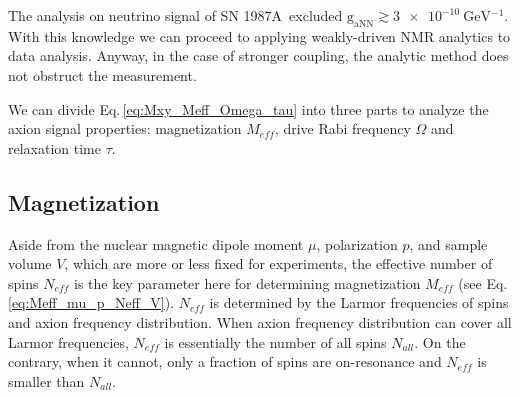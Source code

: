 The analysis on neutrino signal of SN 1987A\,\cite{Raffelt_PhysRevD.86.015001} excluded $\mathrm{g_{aNN}} \gtrsim \SI{3e-10}{\GeV^{-1}}$. 
With this knowledge we can proceed to applying weakly-driven NMR analytics to data analysis. Anyway, in the case of stronger coupling, the analytic method does not obstruct the measurement. 

We can divide Eq.\,\eqref{eq:Mxy_Meff_Omega_tau} into three parts to analyze the axion signal properties: magnetization $M_{eff}$, drive Rabi frequency $\Omega$ and relaxation time $\tau$. 

\subsection{Magnetization}\label{sec:Axion_signal_estimation:Magnetization}

Aside from the nuclear magnetic dipole moment $\mu$, polarization $p$, and sample volume $V$, which are more or less fixed for experiments, the effective number of spins $N_{eff}$ is the key parameter here for determining magnetization $M_{eff}$ (see Eq.\,\eqref{eq:Meff_mu_p_Neff_V}). 
$N_{eff}$ is determined by the Larmor frequencies of spins and axion frequency distribution. When axion frequency distribution can cover all Larmor frequencies, $N_{eff}$ is essentially the number of all spins $N_{all}$. On the contrary, when it cannot, only a fraction of spins are on-resonance and $N_{eff}$ is smaller than $N_{all}$. 


